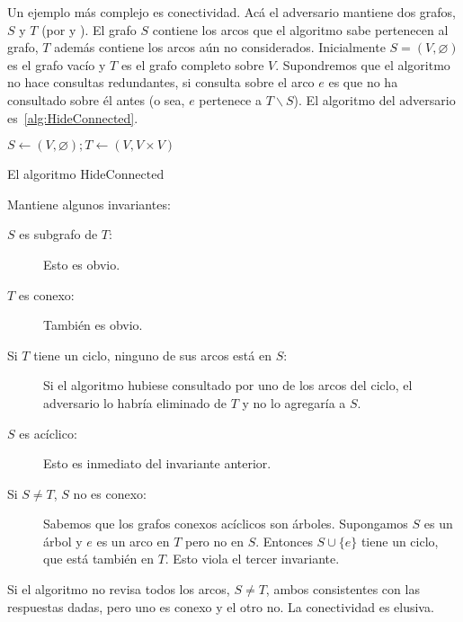   Un ejemplo más complejo es conectividad.
  Acá el adversario mantiene dos grafos,
  \(S\) y \(T\)
  (por  y ).
  El grafo \(S\) contiene los arcos que el algoritmo sabe pertenecen al grafo,
  \(T\) además contiene los arcos aún no considerados.
  Inicialmente \(S = (V, \varnothing)\) es el grafo vacío
  y \(T\) es el grafo completo sobre \(V\).
  Supondremos que el algoritmo no hace consultas redundantes,
  si consulta sobre el arco \(e\) es que no ha consultado sobre él antes
  (o sea,
   \(e\) pertenece a \(T \smallsetminus S\)).
  El algoritmo del adversario es~\ref{alg:HideConnected}.
  \begin{algorithm}
    \DontPrintSemicolon

    \(S \gets (V, \varnothing); T \leftarrow (V, V \times V)\) \;
    \caption{El algoritmo \(\mathrm{HideConnected}\)}
    \label{alg:HideConnected}
  \end{algorithm}
  Mantiene algunos invariantes:
  \begin{description}
  \item[\boldmath\(S\) es subgrafo de \(T\)\unboldmath:]
    Esto es obvio.
  \item[\boldmath\(T\) es conexo\unboldmath:]
    También es obvio.
  \item[\boldmath Si \(T\) tiene un ciclo,
        ninguno de sus arcos está en \(S\)\unboldmath:]
    Si el algoritmo hubiese consultado por uno de los arcos del ciclo,
    el adversario lo habría eliminado de \(T\) y no lo agregaría a \(S\).
  \item[\boldmath\(S\) es acíclico\unboldmath:]
    Esto es inmediato del invariante anterior.
  \item[\boldmath Si \(S \ne T\), \(S\) no es conexo\unboldmath:]
    Sabemos que los grafos conexos acíclicos son árboles.
    Supongamos \(S\) es un árbol y \(e\) es un arco en \(T\) pero no en \(S\).
    Entonces \(S \cup \{ e \}\) tiene un ciclo,
    que está también en \(T\).
    Esto viola el tercer invariante.
  \end{description}
  Si el algoritmo no revisa todos los arcos,
  \(S \ne T\),
  ambos consistentes con las respuestas dadas,
  pero uno es conexo y el otro no.
  La conectividad es elusiva.

